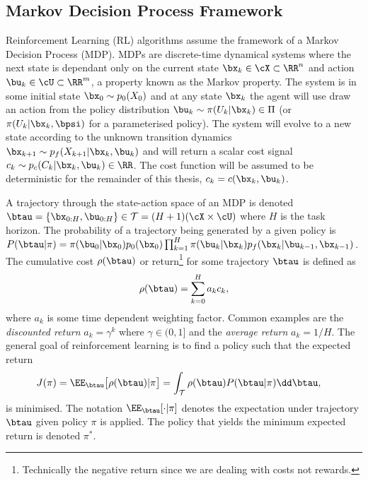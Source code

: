 \subsection{Markov Decision Process Framework}
Reinforcement Learning (RL) algorithms assume the framework of a Markov Decision Process (MDP). MDPs are discrete-time dynamical systems where the next state is dependant only on the current state $\bx_k \in \cX \subset \RR^n$ and action $\bu_k \in \cU \subset \RR^m$, a property known as the Markov property. The system is in some initial state $\bx_0 \sim p_0(X_0)$ and at any state $\bx_k$ the agent will use draw an action from the policy distribution $\bu_k \sim \pi(U_k|\bx_k)\in\Pi$ (or $\pi(U_k|\bx_k,\bpsi)$ for a parameterised policy). The system will evolve to a new state according to the unknown transition dynamics $\bx_{k+1} \sim p_f(X_{k+1}|\bx_k,\bu_k)$ and will return a scalar cost signal $c_k \sim p_c(C_k|\bx_k,\bu_k) \in \RR$. The cost function will be assumed to be deterministic for the remainder of this thesis, $c_k = c(\bx_k,\bu_k)$.

A trajectory through the state-action space of an MDP is denoted $\btau = \{\bx_{0:H},\bu_{0:H}\} \in \mathcal{T} = (H+1)(\cX\times\cU)$ where $H$ is the task horizon. The probability of a trajectory being generated by a given policy is $P(\btau|\pi) = \pi(\bu_0|\bx_0) p_0(\bx_0)\prod_{k=1}^H \pi(\bu_k|\bx_k) p_f(\bx_{k}|\bu_{k-1},\bx_{k-1}) $. The cumulative cost $\rho(\btau)$ or return\footnote{Technically the negative return since we are dealing with costs not rewards.} for some trajectory $\btau$ is defined as
\begin{equation}
\rho(\btau) = \sum^H_{k=0} a_kc_k,
\end{equation}
where $a_k$ is some time dependent weighting factor. Common examples are the \textit{discounted return} $a_k=\gamma^k$ where $\gamma \in (0,1]$ and the \textit{average return} $a_k = 1/H$. The general goal of reinforcement learning is to find a policy such that the expected return
\begin{align}
J(\pi) &= \EE_{\btau} \big[\rho(\btau) | \pi \big] = \int_{\mathcal{T}} \rho(\btau) P(\btau|\pi) \dd \btau,
\end{align}
is minimised. The notation $\EE_{\btau}[\cdot|\pi]$ denotes the expectation under trajectory $\btau$ given policy $\pi$ is applied. The policy that yields the minimum expected return is denoted $\pi^*$.

